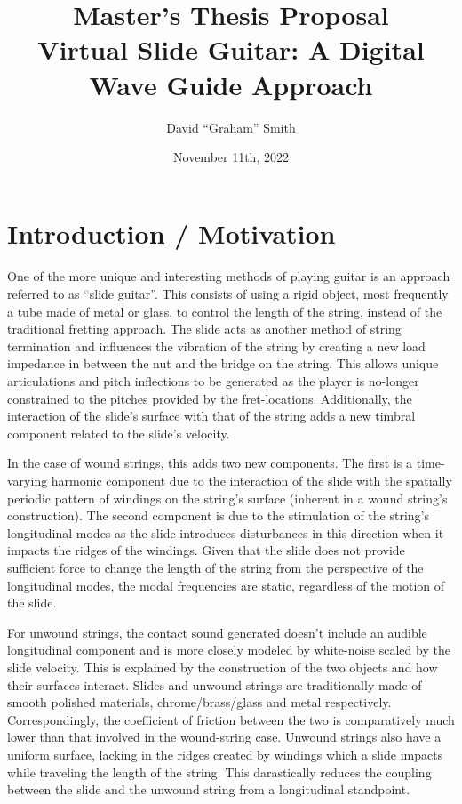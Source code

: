\documentclass[12pt]{article}
\title{Master’s Thesis Proposal \\\Large{Virtual Slide Guitar: A Digital Wave Guide Approach}}
\author{David ``Graham'' Smith}
\date{November 11th, 2022}
\begin{document}
\maketitle

\section*{Introduction / Motivation}
\paragraph{}
One of the more unique and interesting methods of playing guitar is an approach referred to as “slide guitar”. This consists of using a rigid object, most frequently a tube made of metal or glass, to control the length of the string, instead of the traditional fretting approach. The slide acts as another method of string termination and influences the vibration of the string by creating a new load impedance in between the nut and the bridge on the string. This allows unique articulations and pitch inflections to be generated as the player is no-longer constrained to the pitches provided by the fret-locations. Additionally, the interaction of the slide’s surface with that of the string adds a new timbral component related to the slide’s velocity. 

In the case of wound strings, this adds two new components. The first is a time-varying harmonic component due to the interaction of the slide with the spatially periodic pattern of windings on the string’s surface (inherent in a wound string’s construction).  The second component is due to the stimulation of the string’s longitudinal modes as the slide introduces disturbances in this direction when it impacts the ridges of the windings. Given that the slide does not provide sufficient force to change the length of the string from the perspective of the longitudinal modes, the modal frequencies are static, regardless of the motion of the slide. 

For unwound strings, the contact sound generated doesn't include an audible longitudinal component and is more closely modeled by white-noise scaled by the slide velocity. This is explained by the construction of the two objects and how their surfaces interact. Slides and unwound strings are traditionally made of smooth polished materials, chrome/brass/glass and metal respectively. Correspondingly, the coefficient of friction between the two is comparatively much lower than that involved in the wound-string case. Unwound strings also have a uniform surface, lacking in the ridges created by windings which a slide impacts while traveling the length of the string. This darastically reduces the coupling between the slide and the unwound string from a longitudinal standpoint.
\end{document}

